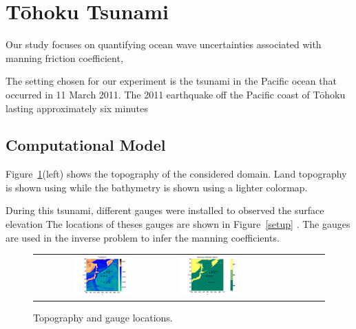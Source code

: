 \section{T\={o}hoku Tsunami}
Our study focuses on quantifying ocean wave uncertainties associated with 
manning friction coefficient, 

The setting chosen for our experiment is the tsunami in the Pacific ocean 
that occurred in 11 March 2011. The 2011 earthquake off the Pacific coast of Tōhoku lasting approximately six minutes


\subsection{Computational Model}
Figure~\ref{fig:setup}(left) shows the topography of the considered domain.
Land topography is shown using while the bathymetry is shown using a lighter colormap.

During this tsunami, different gauges were installed to observed the surface elevation
The locations of theses gauges are shown in Figure~\ref{setup} .
The gauges are used in the inverse problem to infer the manning coefficients.

\begin{figure}[h]
\centering
\begin{tabular}{clc}
\includegraphics[width=0.45\textwidth]{figures/topo.pdf}  &
\includegraphics[width=0.45\textwidth]{figures/coef.pdf} 
\label{setup}
\end{tabular}
\caption{Topography and gauge locations.}
\label{fig:setup}
\end{figure}
